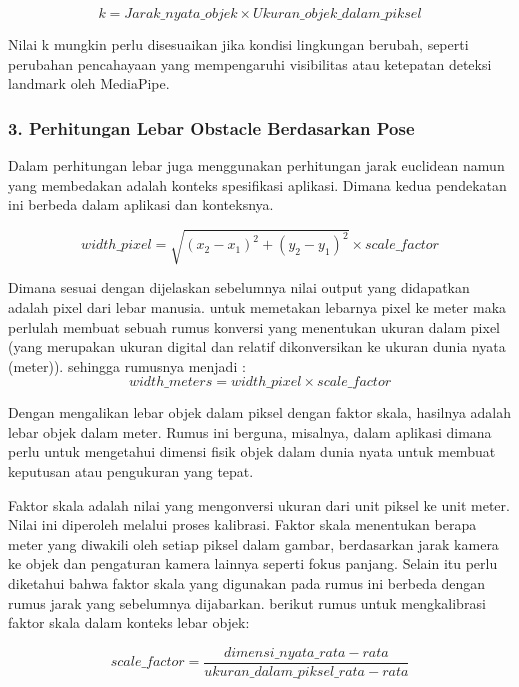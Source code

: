 \begin{equation}
    k ={{Jarak\_nyata\_objek}\times{Ukuran\_objek\_dalam\_piksel}}
\end{equation}

Nilai k mungkin perlu disesuaikan jika kondisi lingkungan berubah, seperti perubahan pencahayaan yang mempengaruhi visibilitas atau ketepatan deteksi landmark oleh MediaPipe.

\subsubsection{3. Perhitungan Lebar Obstacle Berdasarkan Pose}
Dalam perhitungan lebar juga menggunakan perhitungan jarak euclidean namun yang membedakan adalah konteks spesifikasi aplikasi. Dimana kedua pendekatan ini berbeda dalam aplikasi dan konteksnya. 

\begin{equation}
    {width\_pixel} = \sqrt{(x_2 - x_1)^2 + (y_2 - y_1)^2} \times {scale\_factor}
\end{equation}

Dimana sesuai dengan dijelaskan sebelumnya nilai output yang didapatkan adalah pixel dari lebar manusia. untuk memetakan lebarnya pixel ke meter maka perlulah membuat sebuah rumus konversi yang menentukan ukuran dalam pixel (yang merupakan ukuran digital dan relatif dikonversikan ke ukuran dunia nyata (meter)). sehingga rumusnya menjadi : 
\begin{equation}
    {width\_meters} = width\_pixel \times scale\_factor
\end{equation}

Dengan mengalikan lebar objek dalam piksel dengan faktor skala, hasilnya adalah lebar objek dalam meter. Rumus ini berguna, misalnya, dalam aplikasi dimana perlu untuk mengetahui dimensi fisik objek dalam dunia nyata untuk membuat keputusan atau pengukuran yang tepat.

Faktor skala adalah nilai yang mengonversi ukuran dari unit piksel ke unit meter. Nilai ini diperoleh melalui proses kalibrasi. Faktor skala menentukan berapa meter yang diwakili oleh setiap piksel dalam gambar, berdasarkan jarak kamera ke objek dan pengaturan kamera lainnya seperti fokus panjang. Selain itu perlu diketahui bahwa faktor skala yang digunakan pada rumus ini berbeda dengan rumus jarak yang sebelumnya dijabarkan. berikut rumus untuk mengkalibrasi faktor skala dalam konteks lebar objek:

\begin{equation}
    {scale\_factor} = \frac{{dimensi\_nyata\_rata-rata}}{{ukuran\_dalam\_piksel\_rata-rata}}
\end{equation}

